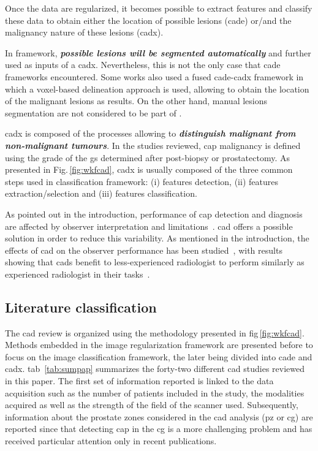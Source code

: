Once the data are regularized, it becomes possible to extract features and classify these data to obtain either the location of possible lesions (\ac{cade}) or/and the malignancy nature of these lesions (\ac{cadx}).

In  framework, \textbf{\textit{possible lesions will be segmented automatically}} and further used as inputs of a \ac{cadx}. Nevertheless, this is not the only case that \ac{cade} frameworks encountered. Some works also used a fused \ac{cade}-\ac{cadx} framework in which a voxel-based delineation approach is used, allowing to obtain the location of the malignant lesions as results. On the other hand, manual lesions segmentation are not considered to be part of .

\Ac{cadx} is composed of the processes allowing to \textbf{\textit{distinguish malignant from non-malignant tumours}}. In the studies reviewed, \ac{cap} malignancy is defined using the grade of the \ac{gs} determined after post-biopsy or prostatectomy. As presented in Fig.\,\ref{fig:wkfcad}, \ac{cadx} is usually composed of the three common steps used in classification framework: (i) features detection, (ii) features extraction/selection and (iii) features classification.

As pointed out in the introduction, performance of \ac{cap} detection and diagnosis are affected by observer interpretation and limitations~\cite{Giger2008,Hambrock2013}. \ac{cad} offers a possible solution in order to reduce this variability. As mentioned in the introduction, the effects of \ac{cad} on the observer performance has been studied~\cite{Hambrock2013}, with results showing that \acp{cad} benefit to less-experienced radiologist to perform similarly as experienced radiologist in their tasks~\cite{Hambrock2013}. 

\subsection{Literature classification}

The \ac{cad} review is organized using the methodology presented in \acs{fig}\,\ref{fig:wkfcad}. Methods embedded in the image regularization framework are presented before to focus on the image classification framework, the later being divided into \ac{cade} and \ac{cadx}. \Acl{tab}~\ref{tab:sumpap} summarizes the forty-two different \ac{cad} studies reviewed in this paper. The first set of information reported is linked to the data acquisition such as the number of patients included in the study, the modalities acquired as well as the strength of the field of the scanner used. Subsequently, information about the prostate zones considered in the \ac{cad} analysis (\ac{pz} or \ac{cg}) are reported since that detecting \ac{cap} in the \ac{cg} is a more challenging problem and has received particular attention only in recent publications.

